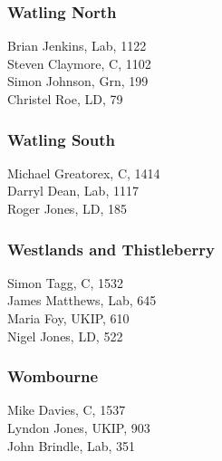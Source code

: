 \documentclass[a4paper,openany,10pt]{book}
\begin{document}
\subsubsection*{Watling North}



Brian Jenkins, Lab, 1122\\
Steven Claymore, C, 1102\\
Simon Johnson, Grn, 199\\
Christel Roe, LD, 79\\


\subsubsection*{Watling South}



Michael Greatorex, C, 1414\\
Darryl Dean, Lab, 1117\\
Roger Jones, LD, 185\\


\subsubsection*{Westlands and Thistleberry}



Simon Tagg, C, 1532\\
James Matthews, Lab, 645\\
Maria Foy, UKIP, 610\\
Nigel Jones, LD, 522\\


\subsubsection*{Wombourne}



Mike Davies, C, 1537\\
Lyndon Jones, UKIP, 903\\
John Brindle, Lab, 351\\
\end{document}
